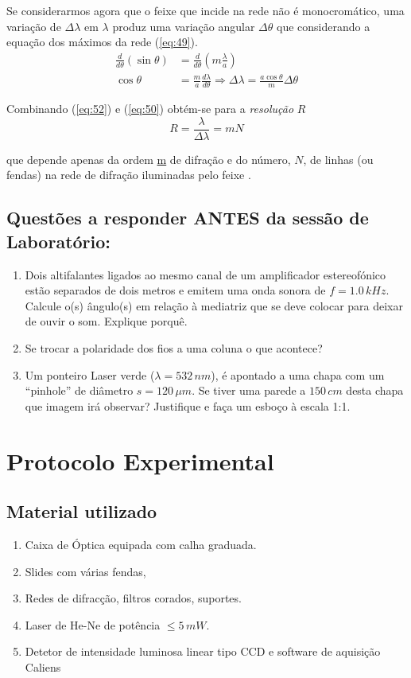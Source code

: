 \documentclass[a4paper,12pt]{article}
\begin{document}
Se considerarmos agora que o feixe que incide na rede não é monocromático, uma variação de $\Delta \lambda$ em  
$\lambda$ produz uma variação angular $\Delta \theta$ que considerando a equação dos máximos da rede (\ref{eq:49}).
\begin{align} \label{eq:51}
 \frac{d}{d \theta} \left( \sin \theta \right) &=  
\frac{d}{d \theta} \left( m  \frac{\lambda}{a}\right) \\ 
\label{eq:52} \cos \theta &= \frac{m }{a} \frac{d \lambda}{d \theta} \Rightarrow 
\Delta \lambda = \frac{a \cos \theta}{m}  \Delta \theta 
\end{align}
 
Combinando (\ref{eq:52}) e (\ref{eq:50})  obtém-se para a \emph{resolução }$R$
\begin{equation} \label{eq:53}
R = \frac{\lambda}{\Delta \lambda} = m N
\end{equation}

que depende apenas da ordem \underline{m} de difração e do número, $N$, de linhas (ou fendas) na rede de difração iluminadas pelo feixe .

\subsection{\sf Questões a responder ANTES da sessão de Laboratório:}
\begin{enumerate}
\item Dois altifalantes ligados ao mesmo canal de um amplificador estereofónico estão  separados de dois metros e emitem uma onda sonora de $f=1.0\,kHz$. Calcule o(s) ângulo(s) em relação à mediatriz que se deve colocar para deixar de ouvir o som. Explique porquê.
\item Se trocar a polaridade  dos fios a uma coluna o que acontece?
\item Um ponteiro Laser verde ($\lambda= 532\,nm$), é apontado a uma chapa com um “pinhole” de diâmetro $s=120\,\mu m$. Se tiver uma parede a
$150\,cm$ desta chapa que imagem irá observar? Justifique e faça um esboço à escala  1:1.
\end{enumerate}
\section{\sf Protocolo Experimental}

\subsection{\sf Material utilizado}
\begin{enumerate}
\item Caixa de Óptica equipada com calha graduada.
\item Slides com várias fendas, 
\item Redes de difracção, filtros corados, suportes. 
\item Laser de He-Ne de potência $\le 5\, mW$.  
\item Detetor de intensidade luminosa linear tipo CCD e software de aquisição Caliens
\end{enumerate}
\end{document}

